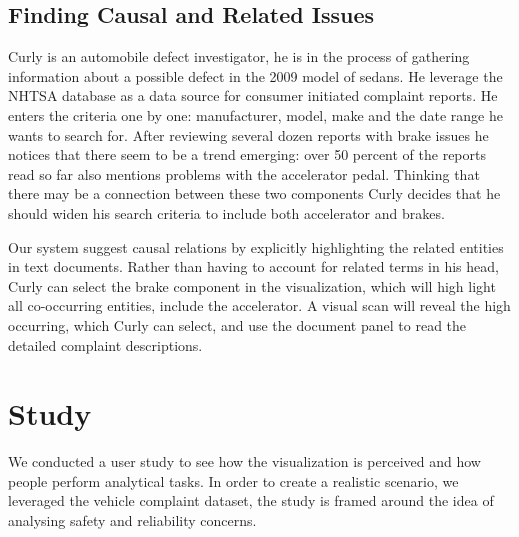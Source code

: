 \subsection{Finding Causal and Related Issues}
Curly is an automobile defect investigator, he is in the process of gathering
information about a possible defect in the 2009 model of sedans. He leverage the
NHTSA database as a data source for consumer initiated complaint reports. He
enters the criteria one by one: manufacturer, model, make and the date range he
wants to search for. After reviewing several dozen reports with brake issues he
notices that there seem to be a trend emerging: over 50 percent of the reports
read so far also mentions problems with the accelerator pedal. Thinking that
there may be a connection between these two components Curly decides that he
should widen his search criteria to include both accelerator and brakes.

Our system suggest causal relations by explicitly highlighting the related
entities in text documents. Rather than having to account for related terms in
his head, Curly can select the brake component in the visualization, which will
high light all co-occurring entities, include the accelerator. A visual scan
will reveal the high occurring, which Curly can select, and use the document
panel to read the detailed complaint descriptions.


\section{Study}
We conducted a user study to see how the visualization is perceived and how
people perform analytical tasks. In order to create a realistic scenario, we
leveraged the vehicle complaint dataset, the study is framed around the idea of
analysing safety and reliability concerns.



